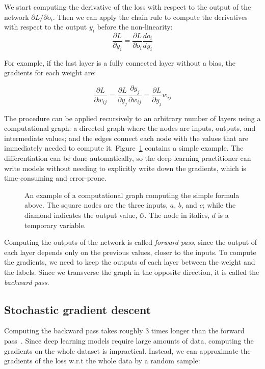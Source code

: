 We start computing the derivative of the loss with respect to the output of the network ${\partial L}/{\partial o_i}$.
Then we can apply the chain rule to compute the derivatives with respect to the output $y_i$ before the non-linearity:
\begin{equation*}
\frac{\partial L}{\partial y_i} = \frac{\partial L}{\partial o_i} \frac{d o_i}{d y_i}
\end{equation*}

For example, if the last layer is a fully connected layer without a bias, the gradients for each weight are:

\begin{equation*}
\frac{\partial L}{\partial w_{ij}} = \frac{\partial L}{\partial y_j} \frac{\partial y_j}{\partial w_{ij}} =  \frac{\partial L}{\partial y_j}  w_{ij}
\end{equation*}

The procedure  can be applied recursively to an arbitrary number of layers using a computational graph: a directed graph where the nodes are inputs, outputs, and intermediate values; and the edges connect each node with the values that are immediately needed to compute it.
Figure~\ref{fig:comp_graph} contains a simple example.
The differentiation can be done automatically, so the deep learning practitioner can write models without needing to explicitly write down the gradients, which is time-consuming and error-prone.

\begin{figure}[bht]
	\centering
	\caption{An example of a computational graph computing the simple formula above.
	The square nodes are the three inputs, $a$, $b$, and $c$; while the diamond indicates the output value, $\mathcal{O}$.
    The node in italics, $\mathit{d}$ is a temporary variable.}\label{fig:comp_graph}
\end{figure}


Computing the outputs 
of the network is called \emph{forward pass}, since the output of each layer depends only on the previous values, closer to the inputs.
To compute the gradients, we need to keep the outputs of each layer between the weight and the labels.
Since we transverse the graph in the opposite direction, it is called the \emph{backward pass}.

\subsection{Stochastic gradient descent}\label{sec:sgd}
Computing the backward pass takes roughly 3 times longer than the forward pass~\citep{dl_course}.
Since deep learning models require large amounts of data, computing the gradients on the whole dataset is impractical.
Instead, we can approximate the gradients of the loss w.r.t the whole data by a random sample:


